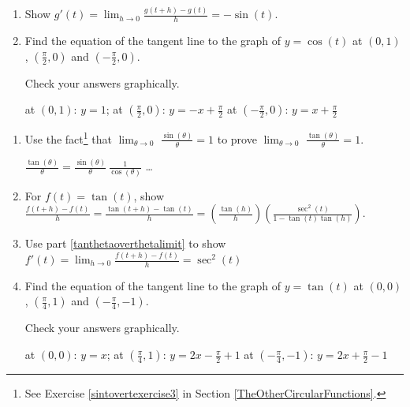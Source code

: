 \documentclass{ximera}
\begin{document}
\begin{question}
\begin{problem}
\begin{enumerate}
\item  Show $g'(t) = \lim_{h \rightarrow 0} \frac{g(t+h) - g(t)}{h} =  - \sin(t)$.

\item  Find the equation of the tangent line to the graph of $y = \cos(t)$ at $(0,1)$, $\left(\frac{\pi}{2}, 0\right)$ and $\left(-\frac{\pi}{2}, 0\right)$.  

Check your answers graphically.

\begin{solution}
at $(0,1)$:  $y = 1$;  at $\left(\frac{\pi}{2}, 0\right)$:  $y = -x + \frac{\pi}{2}$   at $\left(-\frac{\pi}{2}, 0\right)$:  $y = x + \frac{\pi}{2}$
\end{solution}

\end{enumerate}
\end{problem}
\end{question}

\begin{problem}\label{derivativetangent}  

\begin{enumerate}  

\item\label{tanthetaoverthetalimit}  Use the fact\footnote{See Exercise \ref{sintovertexercise3} in Section \ref{TheOtherCircularFunctions}.} that $\lim_{\theta \rightarrow 0}$ $\frac{\sin(\theta)}{\theta} = 1$  to prove $\lim_{\theta \rightarrow 0}$ $\frac{\tan(\theta)}{\theta} = 1$.

\begin{hint}
$\frac{\tan(\theta)}{\theta} = \frac{\sin(\theta)}{\theta} \, \frac{1}{\cos(\theta)}$ \ldots
\end{hint} 

\item 
For $f(t) = \tan(t)$, show $\frac{f(t+h) - f(t)}{h} = \frac{\tan(t + h) - \tan(t)}{h} = \left( \frac{\tan(h)}{h} \right) \left(\frac{\sec^{2}(t)}{1 - \tan(t)\tan(h)} \right)$.
    
\item 
Use part \ref{tanthetaoverthetalimit} to show $f'(t) = \lim_{h \rightarrow 0} \frac{f(t+h) - f(t)}{h} = \sec^{2}(t)$ 

\item 
Find the equation of the tangent line to the graph of $y = \tan(t)$ at $(0,0)$, $\left(\frac{\pi}{4}, 1 \right)$ and $\left(-\frac{\pi}{4}, -1\right)$.  

Check your answers graphically.

\begin{solution}
at $(0,0)$:  $y = x$;  at $\left(\frac{\pi}{4}, 1\right)$:  $y = 2x - \frac{\pi}{2} +1$   at $\left(-\frac{\pi}{4}, -1\right)$:  $y = 2x + \frac{\pi}{2} - 1$
\end{solution}

\end{enumerate}
\end{problem}
\end{document}
